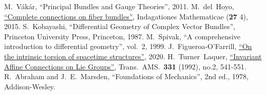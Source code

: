 \begin{thebibliography}{}
     M.~V\'ak\'ar, ``Principal Bundles and Gauge Theories'', 2011.
     M.~del~Hoyo, \href{https://arxiv.org/abs/1512.03847}{``Complete connections on fiber bundles''}, Indagationes Mathematicae (\textbf{27} 4), 2015.
     S.~Kobayashi, ``Differential Geometry of Complex Vector Bundles'', Princeton University Press, Princeton, 1987.
     M.~Spivak, ``A comprehensive introduction to differential geometry'', vol.~2, 1999.
     J.~Figueroa-O'Farrill, \href{https://arxiv.org/abs/2009.01948v1}{``On the intrinsic torsion of spacetime structures''}, 2020.
     H.~Turner~Laquer, \href{https://doi.org/10.2307/2154126}{``Invariant Affine Connections on Lie Groups''}, Trans.~AMS.~\textbf{331} (1992), no.2, 541-551.
     R.~Abraham and J.~E.~Marsden, ``Foundations of Mechanics'', 2nd ed., 1978, Addison-Wesley.
    
\end{thebibliography}